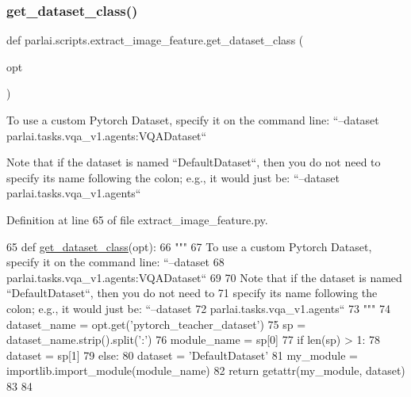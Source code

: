 \subsubsection{\texorpdfstring{get\+\_\+dataset\+\_\+class()}{get\_dataset\_class()}}
{\footnotesize\ttfamily def parlai.\+scripts.\+extract\+\_\+image\+\_\+feature.\+get\+\_\+dataset\+\_\+class (\begin{DoxyParamCaption}\item[{}]{opt }\end{DoxyParamCaption})}

\begin{DoxyVerb}To use a custom Pytorch Dataset, specify it on the command line: ``--dataset
parlai.tasks.vqa_v1.agents:VQADataset``

Note that if the dataset is named ``DefaultDataset``, then you do not need to
specify its name following the colon; e.g., it would just be: ``--dataset
parlai.tasks.vqa_v1.agents``
\end{DoxyVerb}
 

Definition at line 65 of file extract\+\_\+image\+\_\+feature.\+py.


\begin{DoxyCode}
65 \textcolor{keyword}{def }\hyperlink{namespaceparlai_1_1scripts_1_1extract__image__feature_a4fa5d8aef45056034f4898531a0f9967}{get\_dataset\_class}(opt):
66     \textcolor{stringliteral}{"""}
67 \textcolor{stringliteral}{    To use a custom Pytorch Dataset, specify it on the command line: ``--dataset}
68 \textcolor{stringliteral}{    parlai.tasks.vqa\_v1.agents:VQADataset``}
69 \textcolor{stringliteral}{}
70 \textcolor{stringliteral}{    Note that if the dataset is named ``DefaultDataset``, then you do not need to}
71 \textcolor{stringliteral}{    specify its name following the colon; e.g., it would just be: ``--dataset}
72 \textcolor{stringliteral}{    parlai.tasks.vqa\_v1.agents``}
73 \textcolor{stringliteral}{    """}
74     dataset\_name = opt.get(\textcolor{stringliteral}{'pytorch\_teacher\_dataset'})
75     sp = dataset\_name.strip().split(\textcolor{stringliteral}{':'})
76     module\_name = sp[0]
77     \textcolor{keywordflow}{if} len(sp) > 1:
78         dataset = sp[1]
79     \textcolor{keywordflow}{else}:
80         dataset = \textcolor{stringliteral}{'DefaultDataset'}
81     my\_module = importlib.import\_module(module\_name)
82     \textcolor{keywordflow}{return} getattr(my\_module, dataset)
83 
84 
\end{DoxyCode}
\mbox{\label{namespaceparlai_1_1scripts_1_1extract__image__feature_ab634fcc65758e30deaf92980edcc20bd}} 
